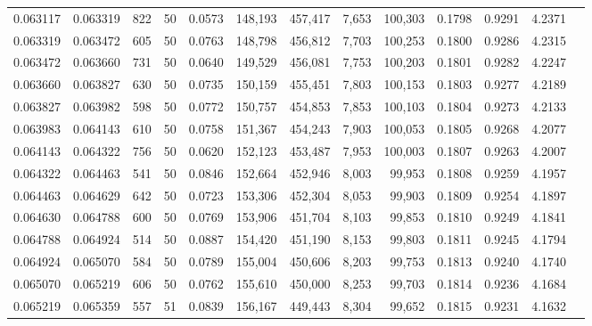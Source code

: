 \begin{tabular}{rrrrrrrrrrrrr}
0.063117 & 0.063319 &   822 &  50 &                                     0.0573 & 148,193 & 457,417 &   7,653 & 100,303 & 0.1798 & 0.9291 & 4.2371 \\
0.063319 & 0.063472 &   605 &  50 &                                     0.0763 & 148,798 & 456,812 &   7,703 & 100,253 & 0.1800 & 0.9286 & 4.2315 \\
0.063472 & 0.063660 &   731 &  50 &                                     0.0640 & 149,529 & 456,081 &   7,753 & 100,203 & 0.1801 & 0.9282 & 4.2247 \\
0.063660 & 0.063827 &   630 &  50 &                                     0.0735 & 150,159 & 455,451 &   7,803 & 100,153 & 0.1803 & 0.9277 & 4.2189 \\
0.063827 & 0.063982 &   598 &  50 &                                     0.0772 & 150,757 & 454,853 &   7,853 & 100,103 & 0.1804 & 0.9273 & 4.2133 \\
0.063983 & 0.064143 &   610 &  50 &                                     0.0758 & 151,367 & 454,243 &   7,903 & 100,053 & 0.1805 & 0.9268 & 4.2077 \\
0.064143 & 0.064322 &   756 &  50 &                                     0.0620 & 152,123 & 453,487 &   7,953 & 100,003 & 0.1807 & 0.9263 & 4.2007 \\
0.064322 & 0.064463 &   541 &  50 &                                     0.0846 & 152,664 & 452,946 &   8,003 &  99,953 & 0.1808 & 0.9259 & 4.1957 \\
0.064463 & 0.064629 &   642 &  50 &                                     0.0723 & 153,306 & 452,304 &   8,053 &  99,903 & 0.1809 & 0.9254 & 4.1897 \\
0.064630 & 0.064788 &   600 &  50 &                                     0.0769 & 153,906 & 451,704 &   8,103 &  99,853 & 0.1810 & 0.9249 & 4.1841 \\
0.064788 & 0.064924 &   514 &  50 &                                     0.0887 & 154,420 & 451,190 &   8,153 &  99,803 & 0.1811 & 0.9245 & 4.1794 \\
0.064924 & 0.065070 &   584 &  50 &                                     0.0789 & 155,004 & 450,606 &   8,203 &  99,753 & 0.1813 & 0.9240 & 4.1740 \\
0.065070 & 0.065219 &   606 &  50 &                                     0.0762 & 155,610 & 450,000 &   8,253 &  99,703 & 0.1814 & 0.9236 & 4.1684 \\
0.065219 & 0.065359 &   557 &  51 &                                     0.0839 & 156,167 & 449,443 &   8,304 &  99,652 & 0.1815 & 0.9231 & 4.1632 \\

\end{tabular}

